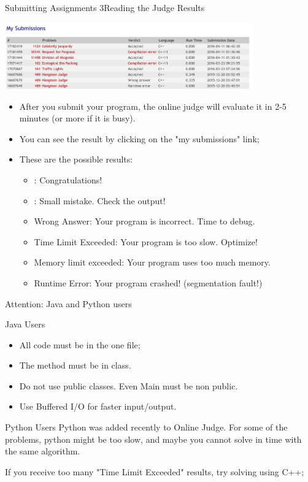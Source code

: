 \begin{frame}{Submitting Assignments 3}{Reading the Judge Results}
  \begin{center}
    \includegraphics[width=0.8\textwidth]{img/uva_result}
  \end{center}

  \begin{itemize}
    \item After you submit your program, the online judge will evaluate it in 2-5 minutes (or more if it is busy).
    \item You can see the result by clicking on the "my submissions" link;
    \item These are the possible results:
    \begin{itemize}
    \item {}: Congratulations!
    \item {}: Small mistake. Check the output!
    \item \alert{Wrong Answer}: Your program is incorrect. Time to debug.
    \item \alert{Time Limit Exceeded}: Your program is too slow. Optimize!
    \item \alert{Memory limit exceeded}: Your program uses too much memory.
    \item \alert{Runtime Error}: Your program crashed! (segmentation fault!)
    \end{itemize}
  \end{itemize}
\end{frame}

\begin{frame}{Attention: Java and Python users}
  \begin{block}{Java Users}
  \begin{itemize}
  \item All code must be in the one file;
    \medskip

  \item The  method must be in  class.
    \medskip

  \item Do not use public classes. Even Main must be non public.
    \medskip

  \item Use Buffered I/O for faster input/output.
  \end{itemize}
  \end{block}
  \begin{block}{Python Users}
    Python was added recently to Online Judge. For some of the problems,
    python might be too slow, and maybe you cannot solve in time
    with the same algorithm.
    \medskip

    If you receive too many "Time Limit Exceeded" results, try solving using
    C++;
  \end{block}
\end{frame}

